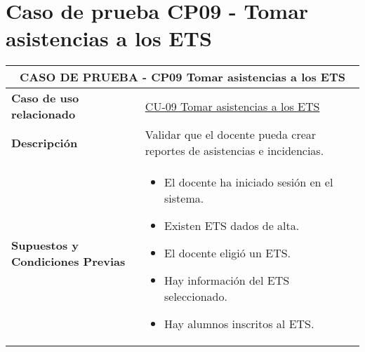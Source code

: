 \section{Caso de prueba CP09 - Tomar asistencias a los ETS}

\begin{longtable}{|p{5cm}|p{10cm}|}
	\hline
	\multicolumn{2}{|c|}{\textbf{CASO DE PRUEBA - CP09 Tomar asistencias a los ETS}} \\
	\hline
	\textbf{Caso de uso relacionado} & \hyperref[CU-09]{CU-09 Tomar asistencias a los ETS} \\
	\hline
	\textbf{Descripción} & Validar que el docente pueda crear reportes de asistencias e incidencias. \\
	\hline
	\textbf{Supuestos y Condiciones Previas} & 
	\begin{itemize}
		\item El docente ha iniciado sesión en el sistema.
		\item Existen ETS dados de alta.
		\item El docente eligió un ETS.
		\item Hay información del ETS seleccionado.
		\item Hay alumnos inscritos al ETS.
		

\end{itemize}
\end{longtable}

